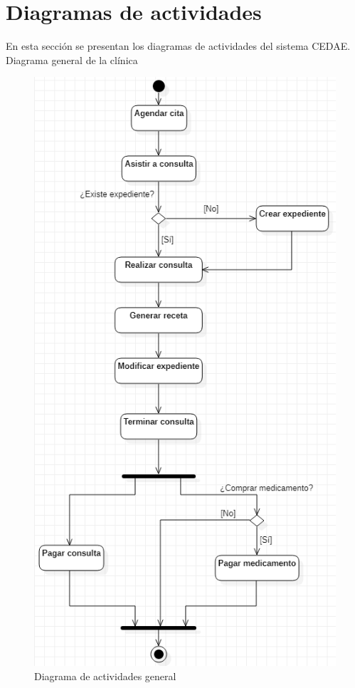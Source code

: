 \documentclass[12pt,letterpaper]{article}
\begin{document}
    \newpage
    \section{Diagramas de actividades}
    En esta sección se presentan los diagramas de actividades del sistema CEDAE.
    \newline
    Diagrama general de la clínica
    \begin{figure}[H]
        \centering
        \includegraphics [scale=0.6]{actividades/general}
        \caption{Diagrama de actividades general}
    \end{figure}
\end{document}
